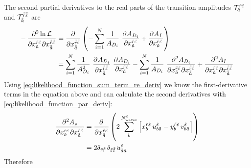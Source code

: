 The second partial derivatives \wrt to the real parts of the
transition amplitudes
$\mathcal{T}_{\tilde{a}}^{\tilde{r} \tilde{\varepsilon}}$ and
$\mathcal{T}_{\tilde{\tilde{a}}}^{\tilde{\tilde{r}} \tilde{\tilde{\varepsilon}}}$
are
\begin{align}
  -\dmd{\ln \mathcal{L}}{2}{{x_{\tilde{a}}^{\tilde{r} \tilde{\refl}}}}{}{{x_{\doubletilde{a}}^{\doubletilde{r} \doubletilde{\refl}}}}{}
  &= \dpd{}{{x_{\doubletilde{a}}^{\doubletilde{r} \doubletilde{\refl}}}}
    \rBrk{-\sum_{i = 1}^{N} \frac{1}{A_{D_i}}\, \dpd{A_{D_i}}{{x_{\tilde{a}}^{\tilde{r} \tilde{\refl}}}} + \dpd{A_I}{{x_{\tilde{a}}^{\tilde{r} \tilde{\refl}}}}} \\
  &= \sum_{i = 1}^{N} \frac{1}{A_{D_i}^2}\, \dpd{A_{D_i}}{{x_{\doubletilde{a}}^{\doubletilde{r} \doubletilde{\refl}}}}\, \dpd{A_{D_i}}{{x_{\tilde{a}}^{\tilde{r} \tilde{\refl}}}}
    - \sum_{i = 1}^{N} \frac{1}{A_{D_i}}\, \dmd{A_{D_i}}{2}{{x_{\tilde{a}}^{\tilde{r} \tilde{\refl}}}}{}{{x_{\doubletilde{a}}^{\doubletilde{r} \doubletilde{\refl}}}}{}
    + \dmd{A_I}{2}{{x_{\tilde{a}}^{\tilde{r} \tilde{\refl}}}}{}{{x_{\doubletilde{a}}^{\doubletilde{r} \doubletilde{\refl}}}}{}
\end{align}
Using \cref{eq:likelihood_function_sum_term_re_deriv} we know the
first-derivative terms in the equation above and can calculate the
second derivatives with \cref{eq:likelihood_function_par_deriv}:
\begin{align}
  \dmd{A_z}{2}{{x_{\tilde{a}}^{\tilde{r} \tilde{\refl}}}}{}{{x_{\doubletilde{a}}^{\doubletilde{r} \doubletilde{\refl}}}}{}
  &= \dpd{}{{x_{\doubletilde{a}}^{\doubletilde{r} \doubletilde{\refl}}}}
    \rBrk{2 \sum_b^{N^{\tilde{\refl}}_\text{waves}} \sBrk{x_b^{\tilde{r} \tilde{\refl}}\, u^{\tilde{\refl}}_{b \tilde{a}}
    - y_b^{\tilde{r} \tilde{\refl}}\, v^{\tilde{\refl}}_{b \tilde{a}}}} \\
  \label{eq:likelihood_function_sum_term_re_re_deriv}
  &= 2 \delta_{\tilde{r} \doubletilde{r}}\, \delta_{\tilde{\refl} \doubletilde{\refl}}\, u^{\tilde{\refl}}_{\doubletilde{a} \tilde{a}}
\end{align}
Therefore
